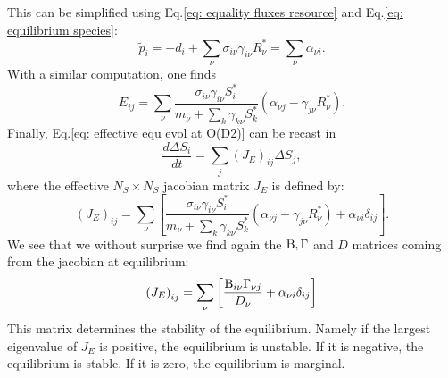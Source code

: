 \documentclass[12pt, titlepage, twoside, openright]{report}
\begin{document}
This can be simplified using Eq.\eqref{eq: equality fluxes resource} and Eq.\eqref{eq: equilibrium species}:
\begin{equation}
\tilde{p}_i=-d_i +\sum_\nu \sigma_{i\nu}\gamma_{i\nu}R^*_\nu = \sum_\nu \alpha_{\nu i}.
\end{equation}
With a similar computation, one finds
\begin{equation}
E_{ij}=\sum_\nu \frac{\sigma_{i\nu}\gamma_{i\nu}S^*_i}{m_\nu+\sum_k \gamma_{k\nu}S^*_k} \left(\alpha_{\nu j}-\gamma_{j\nu}R^*_\nu\right).
\end{equation}
Finally, Eq.\eqref{eq: effective equ evol at O(D2)} can be recast in
\begin{equation}
\frac{d\Delta S_i}{dt} = \sum_j (J_E)_{ij} \Delta S_j,
\end{equation}
where the effective $N_S\times N_S$ jacobian matrix $J_E$ is defined by:
\begin{equation}
(J_E)_{ij}=\sum_\nu \left[\frac{\sigma_{i\nu}\gamma_{i\nu}S^*_i}{m_\nu+\sum_k \gamma_{k\nu}S^*_k} \left(\alpha_{\nu j}-\gamma_{j\nu}R^*_\nu\right)+\alpha_{\nu i}\delta_{ij}\right].
\end{equation}
We see that we without surprise we find again the $\text{B}, \Gamma $ and $D$ matrices coming from the jacobian at equilibrium:
\begin{equation}
\left(J_E\right)_{ij}=\sum_\nu \left[\frac{\text{B}_{i\nu}\Gamma_{\nu j}}{D_\nu}+\alpha_{\nu i} \delta_{ij}\right]
\end{equation}
This matrix determines the stability of the equilibrium. Namely if the largest eigenvalue of $J_E$ is positive, the equilibrium is unstable. If it is negative, the equilibrium is stable. If it is zero, the equilibrium is marginal.
\end{document}
